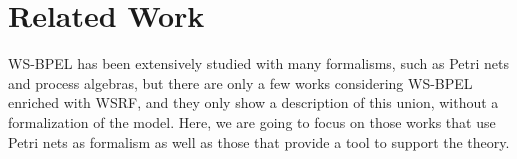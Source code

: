 \section*{Related Work}\label{rWork}

WS-BPEL has been extensively studied with many formalisms, such as
Petri nets and process algebras, but 
there are only a few works considering WS-BPEL enriched with 
WSRF, and they only show a description of this union, 
without a formalization of the model. Here, we are going to focus 
on those works that use Petri nets as formalism as well as those that provide
a tool to support the theory.

